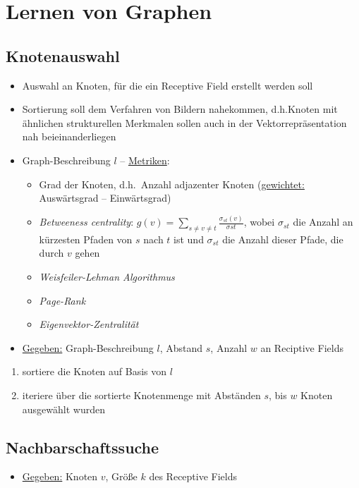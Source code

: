 \section{Lernen von Graphen}

\subsection{Knotenauswahl}

\begin{itemize}
  \item Auswahl an Knoten, für die ein Receptive Field erstellt werden soll
  \item Sortierung soll dem Verfahren von Bildern nahekommen, d.h.\ Knoten mit ähnlichen strukturellen Merkmalen sollen auch in der Vektorrepräsentation nah beieinanderliegen
  \item Graph-Beschreibung $l$ – \underline{Metriken}:
  \begin{itemize}
    \item Grad der Knoten, d.h.\ Anzahl adjazenter Knoten (\underline{gewichtet:} Auswärtsgrad – Einwärtsgrad)
    \item \emph{Betweeness centrality}: $g(v) = \sum_{s \neq v \neq t} \frac{\sigma_{st}(v)}{\sigma{st}}$, wobei $\sigma_{st}$ die Anzahl an kürzesten Pfaden von $s$ nach $t$ ist und $\sigma_{st}$ die Anzahl dieser Pfade, die durch $v$ gehen
    \item \emph{Weisfeiler-Lehman Algorithmus}
    \item \emph{Page-Rank}
    \item \emph{Eigenvektor-Zentralität}
  \end{itemize}
  \item \underline{Gegeben:} Graph-Beschreibung $l$, Abstand $s$, Anzahl $w$ an Reciptive Fields
\end{itemize}

\begin{enumerate}
  \item sortiere die Knoten auf Basis von $l$
  \item iteriere über die sortierte Knotenmenge mit Abständen $s$, bis $w$ Knoten ausgewählt wurden
\end{enumerate}

\subsection{Nachbarschaftssuche}

\begin{itemize}
  \item \underline{Gegeben:} Knoten $v$, Größe $k$ des Receptive Fields
\end{itemize}

